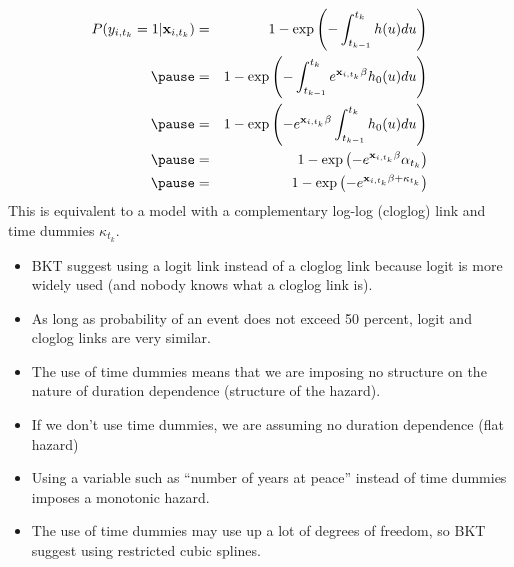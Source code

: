 \documentclass[handout]{beamer}
\begin{document}
\begin{frame}
\begin{eqnarray*}
P(y_{i,t_k} = 1 | \mathbf{x}_{i,t_k}) &=& 1 -  \mathrm{exp} \left(
-\int_{t_{k-1}}^{t_k} h(u) du \right) \\
\pause
&=& 1 - \mathrm{exp} \left( -\int_{t_{k-1}}^{t_k} e^{\mathbf{x}_{i, t_k} \beta}
h_0(u) du \right) \\
\pause
&=&  1 - \mathrm{exp} \left( -e^{\mathbf{x}_{i, t_k} \beta}
\int_{t_{k-1}}^{t_k} h_0(u) du \right) \\
\pause
&=&  1 - \mathrm{exp} \left( -e^{\mathbf{x}_{i, t_k} \beta}
\alpha_{t_k} \right) \\
\pause
&=& 1 - \mathrm{exp} \left( -e^{\mathbf{x}_{i, t_k} \beta +
\kappa_{t_k}} \right) \\
\end{eqnarray*}
\pause
This is equivalent to a model with a complementary log-log (cloglog)
link and time dummies $\kappa_{t_k}$.
\end{frame}

\begin{frame}
\begin{itemize}
\item BKT suggest using a logit link instead of a cloglog link because logit
is more widely used (and nobody knows what a cloglog link is).
\pause
\item As long as probability of an event does not exceed 50 percent,
logit and cloglog links are very similar.
\pause
\item The use of time dummies means that we are imposing no
structure on the nature of duration dependence (structure of the hazard).
\pause
\item If we don't use time dummies, we are assuming no duration
dependence (flat hazard)
\pause
\item Using a variable such as ``number of years at peace'' instead of
time dummies imposes a monotonic hazard.
\pause
\item The use of time dummies may use up a lot of degrees of freedom,
so BKT suggest using restricted cubic splines. 
\end{itemize}
\end{frame}
\end{document}
